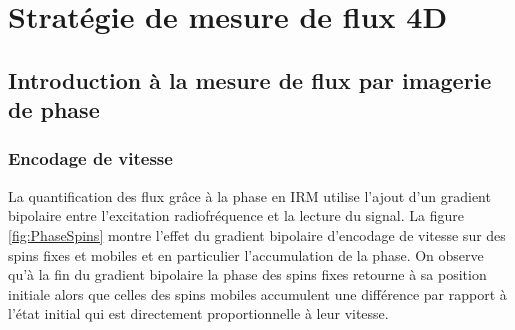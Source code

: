 
\section{Stratégie de mesure de flux 4D}

\subsection{Introduction à la mesure de flux par imagerie de phase}

\subsubsection{Encodage de vitesse}

La quantification des flux grâce à la phase en IRM utilise l'ajout d'un gradient bipolaire entre l'excitation radiofréquence et la lecture du signal. La figure \ref{fig:PhaseSpins} montre l'effet du gradient bipolaire d'encodage de vitesse sur des spins fixes et mobiles et en particulier l'accumulation de la phase. On observe qu'à la fin du gradient bipolaire la phase des spins fixes retourne à sa position initiale alors que celles des spins mobiles accumulent une différence par rapport à l'état initial qui est directement proportionnelle à leur vitesse.

